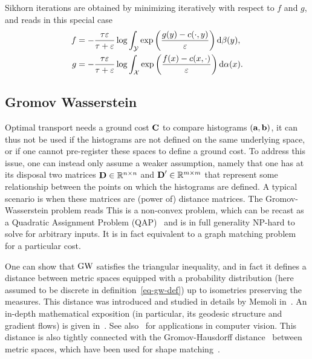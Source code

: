 Sikhorn iterations are obtained by minimizing iteratively with respect to $f$ and $g$, and reads in this special case
\begin{align*}
	f &= -\frac{\tau\varepsilon}{\tau+\varepsilon} \log\int_{\mathcal{Y}} \exp\left(  \frac{g(y) - c(\cdot,y)}{\varepsilon}  \right)  \mathrm{d}\beta(y),  \\
	g &= -\frac{\tau\varepsilon}{\tau+\varepsilon} \log\int_{\mathcal{X}} \exp\left(  \frac{f(x) - c(x,\cdot)}{\varepsilon}  \right)  \mathrm{d}\alpha(x). \\
\end{align*}


\subsection{Gromov Wasserstein}


Optimal transport needs a ground cost $\mathrm{\textbf{\upshape C}}$ to compare histograms $(\mathrm{\textbf{\upshape a}},\mathrm{\textbf{\upshape b}})$, it can thus not be used if the histograms are not defined on the same underlying space, or if one cannot pre-register these spaces to define a ground cost. 
%
To address this issue, one can instead only assume a weaker assumption, namely that one has at its disposal two matrices $\mathrm{\textbf{\upshape D}} \in \mathbb{R}^{n \times n}$ and $\mathrm{\textbf{\upshape D}}' \in \mathbb{R}^{m \times m}$ that represent some relationship between the points on which the histograms are defined. A typical scenario is when these matrices are (power of) distance matrices.
%
The Gromov-Wasserstein problem reads
This is a non-convex problem, which can be recast as a Quadratic Assignment Problem (QAP)~\cite{loiola-2007} and is in full generality NP-hard to solve for arbitrary inputs. 
%
It is in fact equivalent to a graph matching problem~\cite{lyzinski-2015} for a particular cost.

One can show that $\operatorname{\mathrm{GW}}$ satisfies the triangular inequality, and in fact it defines a distance between metric spaces equipped with a probability distribution (here assumed to be discrete in definition~\eqref{eq-gw-def}) up to isometries preserving the measures.
%
This distance was introduced and studied in details by Memoli in~\cite{memoli-2011}. An in-depth mathematical exposition (in particular, its geodesic structure and gradient flows) is given in~\cite{SturmGW}. See also~\cite{schmitzer2013modelling} for applications in computer vision.
%
This distance is also tightly connected with the Gromov-Hausdorff distance~\cite{gromov-2001} between metric spaces, which have been used for shape matching~\cite{memoli-2007,bronstein-2010}. 



